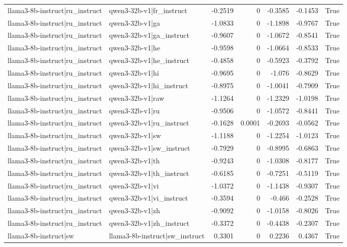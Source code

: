 \begin{table}
\begin{tabular}{l l r r r r l}
llama3-8b-instruct|ru_instruct & qwen3-32b-v1|fr_instruct & -0.2519 & 0 & -0.3585 & -0.1453 & True \\
llama3-8b-instruct|ru_instruct & qwen3-32b-v1|ga & -1.0833 & 0 & -1.1898 & -0.9767 & True \\
llama3-8b-instruct|ru_instruct & qwen3-32b-v1|ga_instruct & -0.9607 & 0 & -1.0672 & -0.8541 & True \\
llama3-8b-instruct|ru_instruct & qwen3-32b-v1|he & -0.9598 & 0 & -1.0664 & -0.8533 & True \\
llama3-8b-instruct|ru_instruct & qwen3-32b-v1|he_instruct & -0.4858 & 0 & -0.5923 & -0.3792 & True \\
llama3-8b-instruct|ru_instruct & qwen3-32b-v1|hi & -0.9695 & 0 & -1.076 & -0.8629 & True \\
llama3-8b-instruct|ru_instruct & qwen3-32b-v1|hi_instruct & -0.8975 & 0 & -1.0041 & -0.7909 & True \\
llama3-8b-instruct|ru_instruct & qwen3-32b-v1|raw & -1.1264 & 0 & -1.2329 & -1.0198 & True \\
llama3-8b-instruct|ru_instruct & qwen3-32b-v1|ru & -0.9506 & 0 & -1.0572 & -0.8441 & True \\
llama3-8b-instruct|ru_instruct & qwen3-32b-v1|ru_instruct & -0.1628 & 0.0001 & -0.2693 & -0.0562 & True \\
llama3-8b-instruct|ru_instruct & qwen3-32b-v1|sw & -1.1188 & 0 & -1.2254 & -1.0123 & True \\
llama3-8b-instruct|ru_instruct & qwen3-32b-v1|sw_instruct & -0.7929 & 0 & -0.8995 & -0.6863 & True \\
llama3-8b-instruct|ru_instruct & qwen3-32b-v1|th & -0.9243 & 0 & -1.0308 & -0.8177 & True \\
llama3-8b-instruct|ru_instruct & qwen3-32b-v1|th_instruct & -0.6185 & 0 & -0.7251 & -0.5119 & True \\
llama3-8b-instruct|ru_instruct & qwen3-32b-v1|vi & -1.0372 & 0 & -1.1438 & -0.9307 & True \\
llama3-8b-instruct|ru_instruct & qwen3-32b-v1|vi_instruct & -0.3594 & 0 & -0.466 & -0.2528 & True \\
llama3-8b-instruct|ru_instruct & qwen3-32b-v1|zh & -0.9092 & 0 & -1.0158 & -0.8026 & True \\
llama3-8b-instruct|ru_instruct & qwen3-32b-v1|zh_instruct & -0.3372 & 0 & -0.4438 & -0.2307 & True \\
llama3-8b-instruct|sw & llama3-8b-instruct|sw_instruct & 0.3301 & 0 & 0.2236 & 0.4367 & True \\

\end{tabular}
\end{table}
